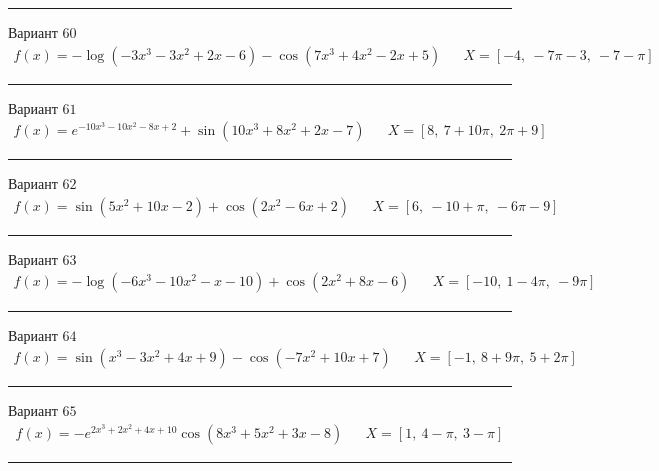 \documentclass[11pt]{report}
\begin{document}
\begin{center}
    \noindent\rule{8cm}{0.4pt}
\end{center}
Вариант \(60\)
\begin{align*}
    f(x) = - \log{\left(- 3 x^{3} - 3 x^{2} + 2 x - 6 \right)} - \cos{\left(7 x^{3} + 4 x^{2} - 2 x + 5 \right)} && X = \left[ -4, \  - 7 \pi - 3, \  -7 - \pi\right]
\end{align*}
\begin{center}
    \noindent\rule{8cm}{0.4pt}
\end{center}
Вариант \(61\)
\begin{align*}
    f(x) = e^{- 10 x^{3} - 10 x^{2} - 8 x + 2} + \sin{\left(10 x^{3} + 8 x^{2} + 2 x - 7 \right)} && X = \left[ 8, \  7 + 10 \pi, \  2 \pi + 9\right]
\end{align*}
\begin{center}
    \noindent\rule{8cm}{0.4pt}
\end{center}
Вариант \(62\)
\begin{align*}
    f(x) = \sin{\left(5 x^{2} + 10 x - 2 \right)} + \cos{\left(2 x^{2} - 6 x + 2 \right)} && X = \left[ 6, \  -10 + \pi, \  - 6 \pi - 9\right]
\end{align*}
\begin{center}
    \noindent\rule{8cm}{0.4pt}
\end{center}
Вариант \(63\)
\begin{align*}
    f(x) = - \log{\left(- 6 x^{3} - 10 x^{2} - x - 10 \right)} + \cos{\left(2 x^{2} + 8 x - 6 \right)} && X = \left[ -10, \  1 - 4 \pi, \  - 9 \pi\right]
\end{align*}
\begin{center}
    \noindent\rule{8cm}{0.4pt}
\end{center}
Вариант \(64\)
\begin{align*}
    f(x) = \sin{\left(x^{3} - 3 x^{2} + 4 x + 9 \right)} - \cos{\left(- 7 x^{2} + 10 x + 7 \right)} && X = \left[ -1, \  8 + 9 \pi, \  5 + 2 \pi\right]
\end{align*}
\begin{center}
    \noindent\rule{8cm}{0.4pt}
\end{center}
Вариант \(65\)
\begin{align*}
    f(x) = - e^{2 x^{3} + 2 x^{2} + 4 x + 10} \cos{\left(8 x^{3} + 5 x^{2} + 3 x - 8 \right)} && X = \left[ 1, \  4 - \pi, \  3 - \pi\right]
\end{align*}
\begin{center}
    \noindent\rule{8cm}{0.4pt}
\end{center}
\end{document}
